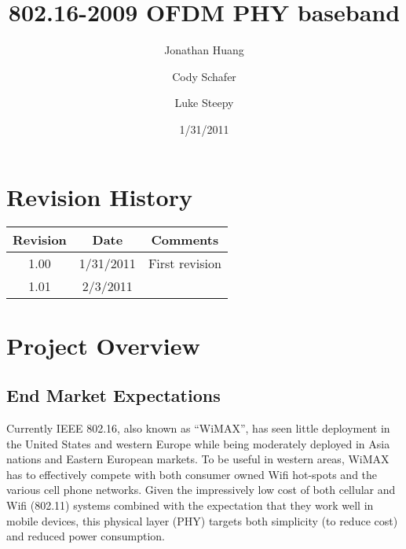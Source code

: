﻿\documentclass[10pt]{article}
\title{802.16-2009 OFDM PHY baseband}
\author{Jonathan Huang \and Cody Schafer \and Luke Steepy}
\date{1/31/2011}
\begin{document}
\maketitle 
\newpage
\section{Revision History}
\begin{tabular}{|c|c|c|}
\hline
Revision & Date & Comments \\ \hline
1.00 & 1/31/2011 & First revision \\ \hline
1.01 & 2/3/2011 & \\ \hline
\end{tabular}
\section{Project Overview}
\subsection{End Market Expectations}
Currently IEEE 802.16, also known as “WiMAX”, has seen little deployment in the United States and western Europe while being moderately deployed in Asia nations and Eastern European markets. To be useful in western areas, WiMAX has to effectively compete with both consumer owned Wifi hot-spots and the various cell phone networks. Given the impressively low cost of both cellular and Wifi (802.11) systems combined with the expectation that they work well in mobile devices, this physical layer (PHY) targets both simplicity (to reduce cost) and reduced power consumption.
\end{document}
